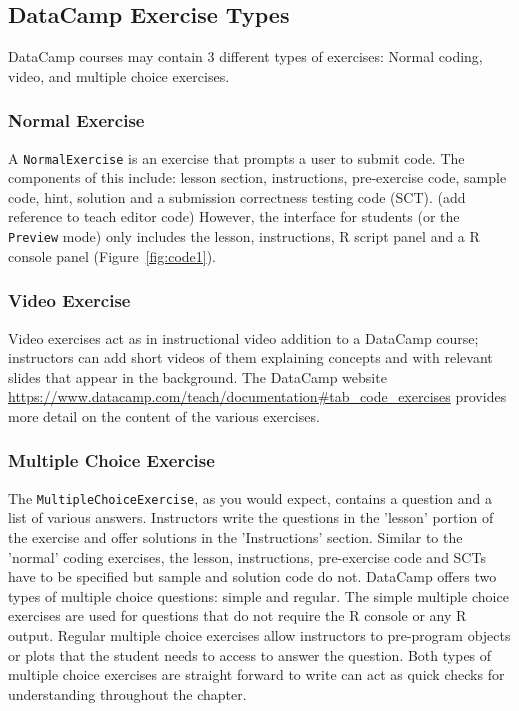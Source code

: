 \documentclass[12pt]{article}\usepackage[]{graphicx}\usepackage[]{color}
\begin{document}
\subsection{DataCamp Exercise Types}
DataCamp courses may contain 3 different types of exercises: Normal coding, video, and multiple choice exercises.
\subsubsection{Normal Exercise}
A \texttt{NormalExercise} is an exercise that prompts a user to submit code. The components of this include: lesson section, instructions, pre-exercise code, sample code, hint, solution and a submission correctness testing code (SCT). (add reference to teach editor code) However, the interface for students (or the \texttt{Preview}
mode) only includes the lesson, instructions, R script panel and a R console panel (Figure~\ref{fig:code1}).
\subsubsection{Video Exercise}
Video exercises act as in instructional video addition to a DataCamp course; instructors can add short videos of them explaining concepts and with 
relevant slides that appear in the background. The DataCamp website \url{https://www.datacamp.com/teach/documentation#tab_code_exercises} provides 
more detail on the content of the various exercises. 

\subsubsection{Multiple Choice Exercise}

The \texttt{MultipleChoiceExercise}, as you would expect, contains a question and a list of various answers. Instructors write the questions in the 'lesson'
portion of the exercise and offer solutions in the 'Instructions' section. Similar to the 'normal' coding exercises, the lesson, instructions, pre-exercise 
code and SCTs have to be specified but sample and solution code do not. DataCamp offers two types of multiple choice questions: simple and regular. 
The simple multiple choice exercises are used for questions that do not require the R console or any R output. Regular multiple choice exercises 
allow instructors to pre-program objects or plots that the student needs to access to answer the question. Both types of multiple choice exercises 
are straight forward to write can act as quick checks for understanding throughout the chapter.
\end{document}
